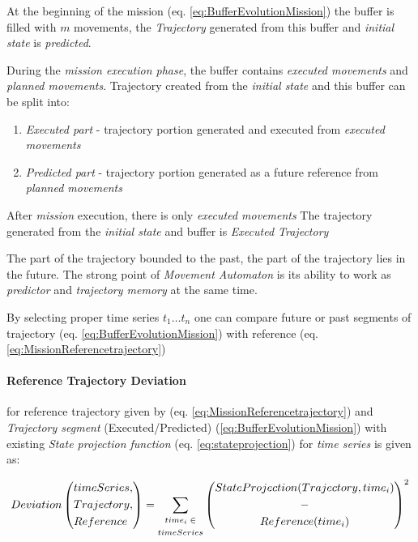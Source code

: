 At the beginning of the mission (eq. \ref{eq:BufferEvolutionMission}) the buffer is filled with $m$ movements, the \emph{Trajectory} generated from this buffer and \emph{initial state} is \emph{predicted}.

During the \emph{mission execution phase}, the buffer contains \emph{executed movements} and \emph{planned movements}. Trajectory created from the \emph{initial state} and this buffer can be split into:

\begin{enumerate}
    \item\emph{Executed part} - trajectory portion generated and executed from \emph{executed movements}
    
    \item\emph{Predicted part} - trajectory portion generated as a future reference from \emph{planned movements} 
\end{enumerate}

After \emph{mission} execution, there is only \emph{executed movements} The trajectory generated from the \emph{initial state} and buffer is \emph{Executed Trajectory}

\begin{note}
    The part of the trajectory bounded to the past, the part of the trajectory lies in the future. The strong point of \emph{Movement Automaton} is its ability to work as \emph{predictor} and \emph{trajectory memory} at the same time.
    
    By selecting proper time series $t_1\dots t_n$ one can compare future or past segments of trajectory (eq. \ref{eq:BufferEvolutionMission}) with reference (eq. \ref{eq:MissionReferencetrajectory})
\end{note}

\paragraph{Reference Trajectory Deviation} for reference trajectory given by (eq. \ref{eq:MissionReferencetrajectory}) and \emph{Trajectory segment} (Executed/Predicted) (\ref{eq:BufferEvolutionMission}) with existing \emph{State projection function} (eq. \ref{eq:stateprojection}) for \emph{time series} is given as:

\begin{equation}\label{eq:ReferenceTrajectoryDeviation}
    Deviation\left(\begin{aligned}&timeSeries,\\ &Trajectory,\\ &Reference\end{aligned}\right) = \sum_{\scriptsize\begin{gathered}time_i \in\\ timeSeries\end{gathered}\normalsize} \left(\begin{gathered}StateProjection(Trajectory,time_i)\\-\\Reference(time_i)\end{gathered}\right)^2
\end{equation}

